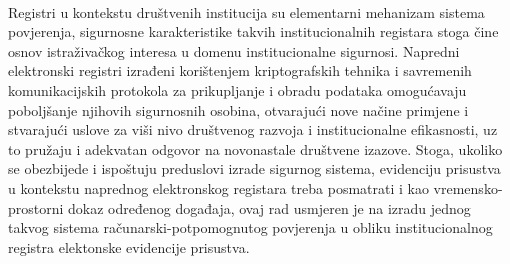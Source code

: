 \paragraph*{}
Registri u kontekstu društvenih institucija su elementarni mehanizam sistema povjerenja, sigurnosne karakteristike takvih institucionalnih registara stoga čine osnov istraživačkog interesa u domenu institucionalne sigurnosi. Napredni elektronski registri izrađeni korištenjem kriptografskih tehnika i savremenih komunikacijskih protokola za prikupljanje i obradu podataka omogućavaju poboljšanje njihovih sigurnosnih osobina, otvarajući nove načine primjene i stvarajući uslove za viši nivo društvenog razvoja i institucionalne efikasnosti, uz to pružaju i adekvatan odgovor na novonastale društvene izazove. Stoga, ukoliko se obezbijede i ispoštuju preduslovi izrade sigurnog sistema, evidenciju prisustva u kontekstu naprednog elektronskog registara treba posmatrati i kao vremensko-prostorni dokaz određenog događaja, ovaj rad usmjeren je na izradu jednog takvog sistema računarski-potpomognutog povjerenja u obliku institucionalnog registra elektonske evidencije prisustva.